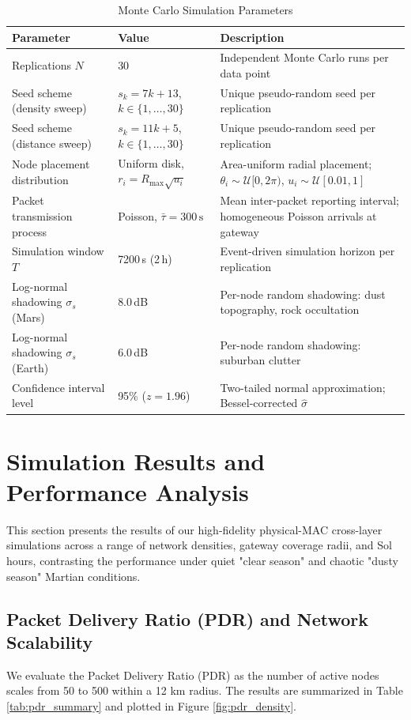 \documentclass[journal,10pt,doublecolumn]{IEEEtran}
\begin{document}
\begin{table}[t]
\renewcommand{\arraystretch}{1.3}
\caption{Monte Carlo Simulation Parameters}
\label{tab:mc_params}
\centering
\begin{tabular}{p{4.8cm}|p{4.2cm}|p{7.5cm}}
\hline
\textbf{Parameter} & \textbf{Value} & \textbf{Description} \\
\hline
Replications $N$ & 30 & Independent Monte Carlo runs per data point \\
Seed scheme (density sweep) & $s_k = 7k+13$, $k\in\{1,\ldots,30\}$ & Unique pseudo-random seed per replication \\
Seed scheme (distance sweep) & $s_k = 11k+5$, $k\in\{1,\ldots,30\}$ & Unique pseudo-random seed per replication \\
Node placement distribution & Uniform disk, $r_i = R_{\max}\sqrt{u_i}$ & Area-uniform radial placement; $\theta_i \sim \mathcal{U}[0,2\pi)$, $u_i \sim \mathcal{U}[0.01,1]$ \\
Packet transmission process & Poisson, $\bar{\tau} = 300\,\text{s}$ & Mean inter-packet reporting interval; homogeneous Poisson arrivals at gateway \\
Simulation window $T$ & 7200\,s (2\,h) & Event-driven simulation horizon per replication \\
Log-normal shadowing $\sigma_s$ (Mars) & 8.0\,dB & Per-node random shadowing: dust topography, rock occultation \\
Log-normal shadowing $\sigma_s$ (Earth) & 6.0\,dB & Per-node random shadowing: suburban clutter \\
Confidence interval level & 95\% ($z = 1.96$) & Two-tailed normal approximation; Bessel-corrected $\hat{\sigma}$ \\
\hline
\end{tabular}
\end{table}

\section{Simulation Results and Performance Analysis}
\label{sec:results}
This section presents the results of our high-fidelity physical-MAC cross-layer simulations across a range of network densities, gateway coverage radii, and Sol hours, contrasting the performance under quiet "clear season" and chaotic "dusty season" Martian conditions.

\subsection{Packet Delivery Ratio (PDR) and Network Scalability}
We evaluate the Packet Delivery Ratio (PDR) as the number of active nodes scales from 50 to 500 within a 12 km radius. The results are summarized in Table \ref{tab:pdr_summary} and plotted in Figure \ref{fig:pdr_density}.
\end{document}
